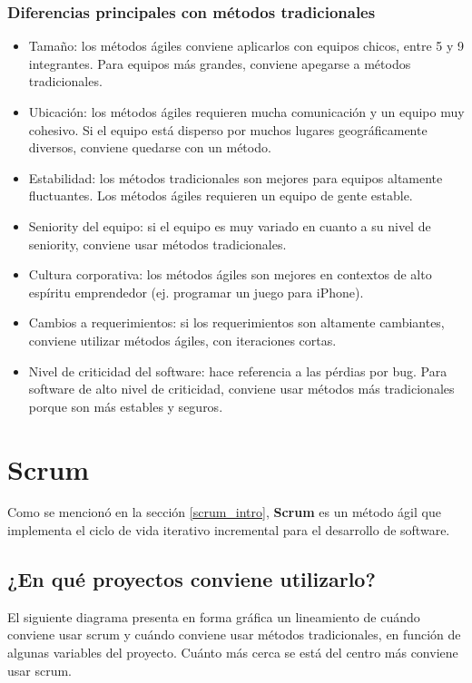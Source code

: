 \documentclass[]{article}
\begin{document}
\subsubsection{Diferencias principales con métodos tradicionales}
\begin{itemize}
	\item Tamaño: los métodos ágiles conviene aplicarlos con equipos chicos, entre 5 y 9 integrantes. Para equipos más grandes, conviene apegarse a métodos tradicionales.
	\item Ubicación: los métodos ágiles requieren mucha comunicación y un equipo muy cohesivo. Si el equipo está disperso por muchos lugares geográficamente diversos, conviene quedarse con un método.
	\item Estabilidad: los métodos tradicionales son mejores para equipos altamente fluctuantes. Los métodos ágiles requieren un equipo de gente estable.
	\item Seniority del equipo: si el equipo es muy variado en cuanto a su nivel de seniority, conviene usar métodos tradicionales.
	\item Cultura corporativa: los métodos ágiles son mejores en contextos de alto espíritu emprendedor (ej. programar un juego para iPhone).
	\item Cambios a requerimientos: si los requerimientos son altamente cambiantes, conviene utilizar métodos ágiles, con iteraciones cortas.
	\item Nivel de criticidad del software: hace referencia a las pérdias por bug. Para software de alto nivel de criticidad, conviene usar métodos más tradicionales porque son más estables y seguros.
\end{itemize}

\section{Scrum}
Como se mencionó en la sección \ref{scrum_intro}, \textbf{Scrum} es un método ágil que implementa el ciclo de vida iterativo incremental para el desarrollo de software.

\subsection{¿En qué proyectos conviene utilizarlo?}
El siguiente diagrama presenta en forma gráfica un lineamiento de cuándo conviene usar scrum y cuándo conviene usar métodos tradicionales, en función de algunas variables del proyecto. Cuánto más cerca se está del centro más conviene usar scrum.
\end{document}
